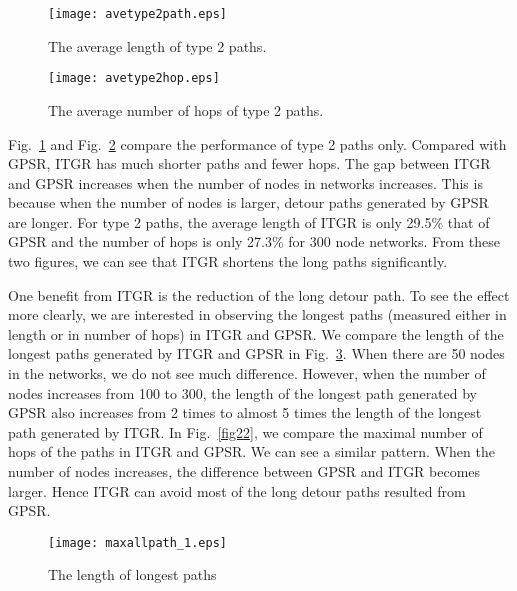 \documentclass[3p,times]{elsarticle}
\begin{document}
\begin{figure}[!htp]
\begin{center}
\texttt{[image: avetype2path.eps]}
\end{center}
\caption{The average length of type 2 paths.}
\label{fig19}
\end{figure}

\begin{figure}[htp]
\begin{center}
\texttt{[image: avetype2hop.eps]}
\end{center}
\caption{The average number of hops of type 2 paths.}
\label{fig20}
\end{figure}


Fig.~\ref{fig19} and  Fig.~\ref{fig20} compare the performance of type 2 paths only.
Compared with GPSR,
ITGR has much shorter paths and fewer hops.
The gap between  ITGR and GPSR increases when the number of nodes in networks increases.
This is because when the number of nodes is larger,
detour paths generated by GPSR are longer.
For type 2 paths, the average length of ITGR is only 29.5\%
that of GPSR and the number of hops is only 27.3\% for 300 node networks.
From these two figures, we can see that ITGR shortens the long paths significantly.



One benefit from ITGR is the reduction of the long detour path. To see the effect more clearly,
we are interested in observing the longest paths (measured either in length or in number of hops)
in ITGR and GPSR.
We compare the length of the longest paths generated
by ITGR and GPSR in Fig.~\ref{fig21}.
When there are 50 nodes in the networks, we do not see much difference. However,
when the number of nodes increases from 100 to 300, the length
of the longest path generated by GPSR also increases from 2 times to almost 5 times
the length of the longest path generated by ITGR.
In Fig.~\ref{fig22}, we compare the maximal number of hops of the paths in ITGR and GPSR.
We can see a similar pattern. When the number of nodes increases,
the difference between GPSR and ITGR becomes larger.
Hence ITGR can avoid most of the long detour paths resulted from GPSR.

\begin{figure}[!htp]
\begin{center}
\texttt{[image: maxallpath\_1.eps]}
\end{center}
\caption{The length of longest paths}
\label{fig21}
\end{figure}
\end{document}
